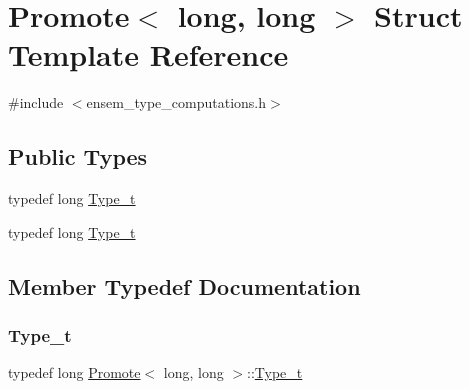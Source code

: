 \hypertarget{structPromote_3_01long_00_01long_01_4}{}\section{Promote$<$ long, long $>$ Struct Template Reference}
\label{structPromote_3_01long_00_01long_01_4}


{\ttfamily \#include $<$ensem\+\_\+type\+\_\+computations.\+h$>$}

\subsection*{Public Types}
\begin{DoxyCompactItemize}
\item 
typedef long \mbox{\hyperlink{structPromote_3_01long_00_01long_01_4_a5f00bb17e1f226cbed5e9b1ab9e96081}{Type\+\_\+t}}
\item 
typedef long \mbox{\hyperlink{structPromote_3_01long_00_01long_01_4_a5f00bb17e1f226cbed5e9b1ab9e96081}{Type\+\_\+t}}
\end{DoxyCompactItemize}


\subsection{Member Typedef Documentation}
\mbox{\label{structPromote_3_01long_00_01long_01_4_a5f00bb17e1f226cbed5e9b1ab9e96081}} 
\subsubsection{\texorpdfstring{Type\_t}{Type\_t}\hspace{0.1cm}{\footnotesize\ttfamily [1/2]}}
{\footnotesize\ttfamily typedef long \mbox{\hyperlink{structPromote}{Promote}}$<$ long, long $>$\+::\mbox{\hyperlink{structPromote_3_01long_00_01long_01_4_a5f00bb17e1f226cbed5e9b1ab9e96081}{Type\+\_\+t}}}

\mbox{\label{structPromote_3_01long_00_01long_01_4_a5f00bb17e1f226cbed5e9b1ab9e96081}} 
